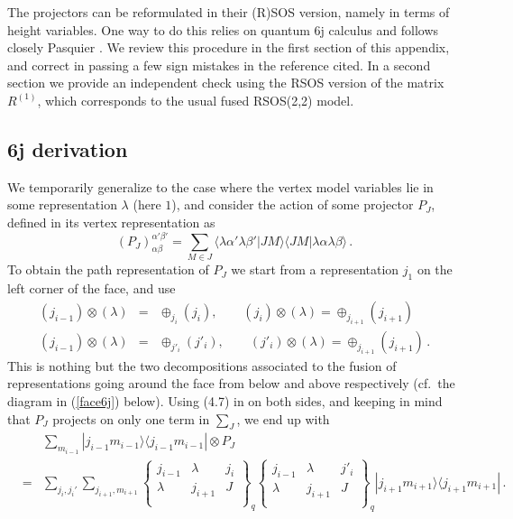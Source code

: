\documentclass[11pt]{article}
\begin{document}
The projectors can be reformulated in their (R)SOS version, namely in terms of height variables. 
One way to do this relies on quantum 6j calculus and follows closely Pasquier \cite{Vincent}. We review this procedure in the first section of this appendix, and correct in passing a few sign mistakes in the reference cited. 
In a second section we provide an independent check using the RSOS version of the matrix $R^{(1)}$, which corresponds to the usual fused RSOS(2,2) model. 

\subsection{6j derivation}
\label{RSOS_R2}

We temporarily generalize to the case where the vertex model variables lie in some representation $\lambda$ (here $1$), and consider the action of some projector $P_J$, defined in its vertex representation as
%
\begin{equation}
\left(P_J \right)_{\alpha \beta}^{\alpha' \beta'} = \sum_{M \in J} \langle \lambda \alpha' \lambda \beta' | J M \rangle \langle J M  | \lambda \alpha \lambda \beta \rangle  \,.
\end{equation}
%
To obtain the path representation of $P_J$ we start from a representation $j_1$ on the left corner of the face, and use  
\begin{eqnarray}
 (j_{i-1})\otimes (\lambda) &=& \oplus_{j_i} (j_i) , \qquad  (j_i) \otimes (\lambda) = \oplus_{j_{i+1}}(j_{i+1}) \, \\   
  (j_{i-1})\otimes (\lambda) &=& \oplus_{j'_i} (j'_i) , \qquad (j'_i) \otimes (\lambda) = \oplus_{j_{i+1}}(j_{i+1}) \,.
\end{eqnarray}
%
%
This is nothing but the two decompositions associated to the fusion of representations going around the face from below and above respectively
(cf.\ the diagram in (\ref{face6j}) below).
Using (4.7) in \cite{SaleurZuber} on both sides, and keeping in mind that $P_J$ projects on only one term in $\sum_J$, we end up with
\begin{eqnarray}
 & & \sum_{m_{i-1}} |j_{i-1}m_{i-1} \rangle \langle  j_{i-1}m_{i-1} | \otimes P_J \nonumber \\
 & = & \sum_{j_i, j_i '} \sum_{j_{i+1}, m_{i+1}}
 \left\{  \begin{array}{ccc}
  j_{i-1} & \lambda & j_i \\ \lambda & j_{i+1} & J  \\ \end{array}   \right\}_q
   \left\{  \begin{array}{ccc}
  j_{i-1} & \lambda & j'_i \\ \lambda & j_{i+1} & J  \\ \end{array}   \right\}_q
|j_{i+1}m_{i+1} \rangle \langle  j_{i+1}m_{i+1} | \,.
\end{eqnarray}
\end{document}
